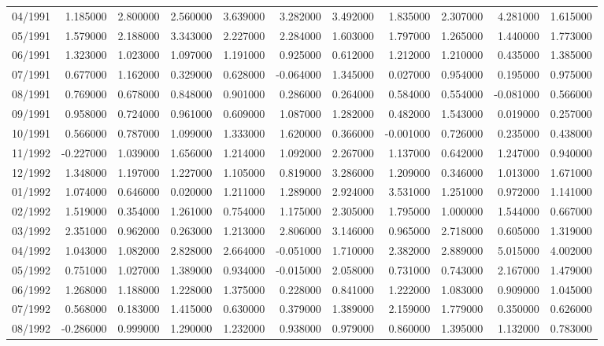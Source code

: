 \begin{tabular}{lrrrrrrrrrr}
04/1991 & 1.185000 & 2.800000 & 2.560000 & 3.639000 & 3.282000 & 3.492000 & 1.835000 & 2.307000 & 4.281000 & 1.615000 \\
05/1991 & 1.579000 & 2.188000 & 3.343000 & 2.227000 & 2.284000 & 1.603000 & 1.797000 & 1.265000 & 1.440000 & 1.773000 \\
06/1991 & 1.323000 & 1.023000 & 1.097000 & 1.191000 & 0.925000 & 0.612000 & 1.212000 & 1.210000 & 0.435000 & 1.385000 \\
07/1991 & 0.677000 & 1.162000 & 0.329000 & 0.628000 & -0.064000 & 1.345000 & 0.027000 & 0.954000 & 0.195000 & 0.975000 \\
08/1991 & 0.769000 & 0.678000 & 0.848000 & 0.901000 & 0.286000 & 0.264000 & 0.584000 & 0.554000 & -0.081000 & 0.566000 \\
09/1991 & 0.958000 & 0.724000 & 0.961000 & 0.609000 & 1.087000 & 1.282000 & 0.482000 & 1.543000 & 0.019000 & 0.257000 \\
10/1991 & 0.566000 & 0.787000 & 1.099000 & 1.333000 & 1.620000 & 0.366000 & -0.001000 & 0.726000 & 0.235000 & 0.438000 \\
11/1992 & -0.227000 & 1.039000 & 1.656000 & 1.214000 & 1.092000 & 2.267000 & 1.137000 & 0.642000 & 1.247000 & 0.940000 \\
12/1992 & 1.348000 & 1.197000 & 1.227000 & 1.105000 & 0.819000 & 3.286000 & 1.209000 & 0.346000 & 1.013000 & 1.671000 \\
01/1992 & 1.074000 & 0.646000 & 0.020000 & 1.211000 & 1.289000 & 2.924000 & 3.531000 & 1.251000 & 0.972000 & 1.141000 \\
02/1992 & 1.519000 & 0.354000 & 1.261000 & 0.754000 & 1.175000 & 2.305000 & 1.795000 & 1.000000 & 1.544000 & 0.667000 \\
03/1992 & 2.351000 & 0.962000 & 0.263000 & 1.213000 & 2.806000 & 3.146000 & 0.965000 & 2.718000 & 0.605000 & 1.319000 \\
04/1992 & 1.043000 & 1.082000 & 2.828000 & 2.664000 & -0.051000 & 1.710000 & 2.382000 & 2.889000 & 5.015000 & 4.002000 \\
05/1992 & 0.751000 & 1.027000 & 1.389000 & 0.934000 & -0.015000 & 2.058000 & 0.731000 & 0.743000 & 2.167000 & 1.479000 \\
06/1992 & 1.268000 & 1.188000 & 1.228000 & 1.375000 & 0.228000 & 0.841000 & 1.222000 & 1.083000 & 0.909000 & 1.045000 \\
07/1992 & 0.568000 & 0.183000 & 1.415000 & 0.630000 & 0.379000 & 1.389000 & 2.159000 & 1.779000 & 0.350000 & 0.626000 \\
08/1992 & -0.286000 & 0.999000 & 1.290000 & 1.232000 & 0.938000 & 0.979000 & 0.860000 & 1.395000 & 1.132000 & 0.783000 \\

\end{tabular}
